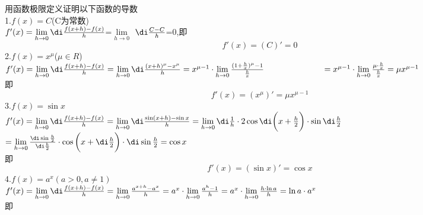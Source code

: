 \texample[用函数极限定义证明以下函数的导数] \sj
\examples 用函数极限定义证明以下函数的导数\vspace{0.8em} \\
1.\enspace$f(x)=C$(C为常数)\vspace{0.8em}\\ 
\solve $f'(x)=\lim\limits_{h\to 0}\di \frac{f(x+h)-f(x)}{h}$=$\lim\limits_{h\to 0}$ $\di\frac{C-C}{h}$=0,即
\vspace*{-0.5em}
\begin{equation}
	\nonumber
	f'(x)=(C)'=0
\end{equation}
2.\enspace$f(x)=x^{\mu}$($\mu \in R$)
\vspace{0.8em} \\ \solve $f'(x)=\lim\limits_{h\to 0} \di\frac{f(x+h)-f(x)}{h}=\lim\limits_{h\to 0}\di\frac{(x+h)^{\mu}-x^\mu}{h}=x^{\mu-1}\cdot \lim\limits_{h\to 0}\frac{(1+\frac{h}{x})^\mu-1}{\frac{h}{x}}\\
\hspace*{7em}=x^{\mu-1}\cdot\lim\limits_{h\to 0}\frac{\mu\cdot\frac{h}{x}}{\frac{h}{x}}=\mu x^{\mu-1}$\vspace{0.8em}\\即
\begin{equation}
	\nonumber
	f'(x)=(x^\mu)'=\mu x^{\mu-1}
\end{equation}
3.\enspace$f(x)=\sin x$
\vspace{0.8em} \\ \solve $f'(x)=\lim\limits_{h\to 0}\di\frac{f(x+h)-f(x)}{h}=\lim\limits_{h\to 0}\di\frac{\sin (x+h)-\sin x}{h}=\lim\limits_{h\to 0}\di\frac{1}{h}\cdot 2\cos\di\bigg(x+\frac{h}{2}\bigg)\cdot\sin\di\frac{h}{2}$\\  
\hspace*{7em} $=\lim\limits_{h\to 0}\frac{\di\sin\frac{h}{2}}{\di\frac{h}{2}}\cdot\cos\bigg(x+\di\frac{h}{2}\bigg)\cdot\di\sin\frac{h}{2}=\cos x$
\\即
\vspace{0.8em}
\begin{equation}
	\nonumber
	f'(x)=(\sin x)'=\cos x
\end{equation}
4.\enspace$f(x)=a^x(a>0,a\neq1)$
\vspace{0.8em} \\ \solve
$f'(x)=\lim\limits_{h\to 0}\di \frac{f(x+h)-f(x)}{h}=\lim\limits_{h\to0}\frac{a^{x+h}-a^x}{h}=a^x\cdot\lim\limits_{h\to0}\frac{a^h-1}{h}=a^x\cdot\lim\limits_{h\to0}\frac{h\cdot \ln a}{h}=\ln a\cdot a^x$\\
即
\vspace*{0.5em}
